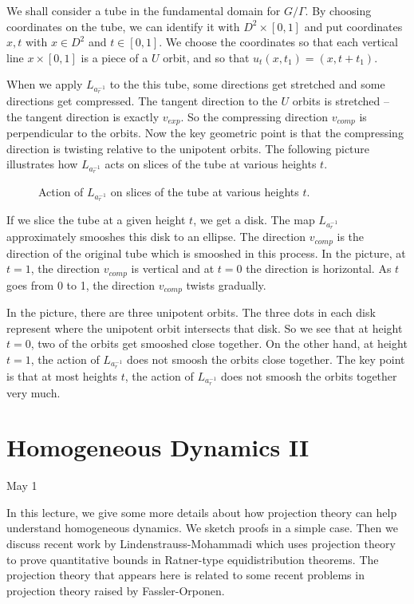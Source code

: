 \documentclass[12pt]{amsart}
\begin{document}
We shall consider a tube in the fundamental domain for $G/\Gamma$.   By choosing coordinates on the tube,  we can identify it with $D^2 \times [0,1]$ and put coordinates $x,t$ with $x \in D^2$ and $t \in [0,1]$.   We choose the coordinates so that each vertical line ${x} \times [0,1]$ is a piece of a $U$ orbit,  and so that $u_t(x, t_1) = (x, t + t_1)$. 

When we apply $L_{a_r^{-1}}$ to the this tube,  some directions get stretched and some directions get compressed.   The tangent direction to the $U$ orbits is stretched -- the tangent direction is exactly $v_{exp}$.    So the compressing direction $v_{comp}$ is perpendicular to the orbits.   Now the key geometric point is that the compressing direction is twisting relative to the unipotent orbits.  The following picture illustrates how $L_{a_r^{-1}}$ acts on slices of the tube at various heights $t$.  

\begin{figure}[h]
    \centering
    
    \caption{Action of $L_{a_r^{-1}}$ on slices of the tube at various heights $t$.}
    \label{fig:may1p1}
\end{figure}

If we slice the tube at a given height $t$,  we get a disk.   The map $L_{a_r^{-1}}$ approximately smooshes this disk to an ellipse.   The direction $v_{comp}$ is the direction of the original tube which is smooshed in this process.   In the picture,  at $t=1$,  the direction $v_{comp}$ is vertical and at $t=0$ the direction is horizontal.   As $t$ goes from 0 to 1,  the direction $v_{comp}$ twists gradually.

In the picture, there are three unipotent orbits.  The three dots in each disk represent where the unipotent orbit intersects that disk.  So we see that at height $t=0$, two of the orbits get smooshed close together.  On the other hand, at height $t=1$, the action of $L_{a_r^{-1}}$ does not smoosh the orbits close together.  The key point is that at most heights $t$, the action of $L_{a_r^{-1}}$ does not smoosh the orbits together very much. 


\newpage

\section{Homogeneous Dynamics II}

May 1

In this lecture,  we give some more details about how projection theory can help understand homogeneous dynamics.   We sketch proofs in a simple case.  Then we discuss recent work by Lindenstrauss-Mohammadi which uses projection theory to prove quantitative bounds in Ratner-type equidistribution theorems.    The projection theory that appears here is related to some recent problems in projection theory raised by Fassler-Orponen.
\end{document}
